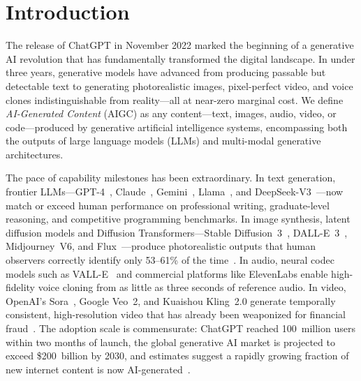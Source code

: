 
\section{Introduction}
\label{sec:introduction}


The release of ChatGPT in November 2022 marked the beginning of a generative AI revolution that has fundamentally transformed the digital landscape. In under three years, generative models have advanced from producing passable but detectable text to generating photorealistic images, pixel-perfect video, and voice clones indistinguishable from reality---all at near-zero marginal cost. We define \emph{AI-Generated Content} (AIGC) as any content---text, images, audio, video, or code---produced by generative artificial intelligence systems, encompassing both the outputs of large language models (LLMs) and multi-modal generative architectures.

The pace of capability milestones has been extraordinary. In text generation, frontier LLMs---GPT-4~\cite{gpt4}, Claude~\cite{anthropic2025claude}, Gemini~\cite{gemini2024}, Llama~\cite{llama3}, and DeepSeek-V3~\cite{deepseekv3}---now match or exceed human performance on professional writing, graduate-level reasoning, and competitive programming benchmarks. In image synthesis, latent diffusion models and Diffusion Transformers---Stable Diffusion~3~\cite{esser2024sd3}, DALL-E~3~\cite{dalle3}, Midjourney~V6, and Flux~\cite{flux2024}---produce photorealistic outputs that human observers correctly identify only 53--61\% of the time~\cite{microsoft2025human}. In audio, neural codec models such as VALL-E~\cite{wang2023valle} and commercial platforms like ElevenLabs enable high-fidelity voice cloning from as little as three seconds of reference audio. In video, OpenAI's Sora~\cite{brooks2024sora}, Google Veo~2, and Kuaishou Kling~2.0 generate temporally consistent, high-resolution video that has already been weaponized for financial fraud~\cite{brightside2025phishing}. The adoption scale is commensurate: ChatGPT reached 100~million users within two months of launch, the global generative AI market is projected to exceed \$200~billion by 2030, and estimates suggest a rapidly growing fraction of new internet content is now AI-generated~\cite{graphite2025aicontent}.

